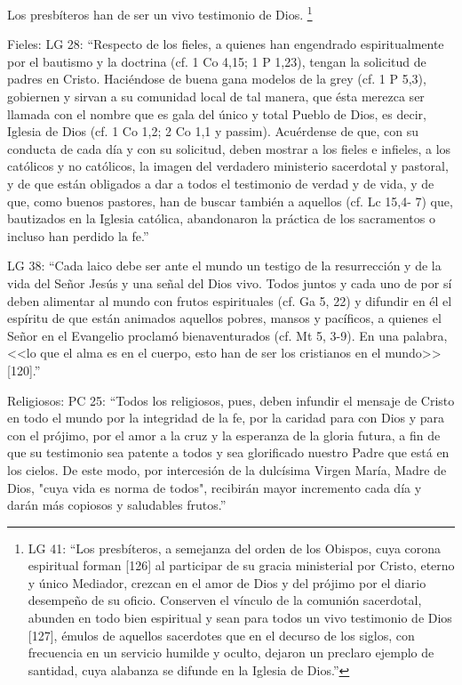 \documentclass[12pt]{article}
\begin{document}
Los presbíteros han de ser un vivo testimonio de Dios.
\footnote{
LG 41: 
``Los presbíteros, a semejanza del orden de los Obispos, cuya corona espiritual forman [126] al participar de su gracia ministerial por Cristo, eterno y único Mediador, crezcan en el amor de Dios y del prójimo por el diario desempeño de su oficio. Conserven el vínculo de la comunión sacerdotal, abunden en todo bien espiritual y sean para todos un vivo testimonio de Dios [127], émulos de aquellos sacerdotes que en el decurso de los siglos, con frecuencia en un servicio humilde y oculto, dejaron un preclaro ejemplo de santidad, cuya alabanza se difunde en la Iglesia de Dios.''
}

Fieles:
LG 28:  
``Respecto de los fieles, a quienes han engendrado espiritualmente por el bautismo y la doctrina (cf. 1 Co 4,15; 1 P 1,23), tengan la solicitud de padres en Cristo. Haciéndose de buena gana modelos de la grey (cf.  1 P 5,3), gobiernen y sirvan a su comunidad local de tal manera, que ésta merezca ser llamada con el nombre que es gala del único y total Pueblo de Dios, es decir, Iglesia de Dios (cf. 1 Co 1,2; 2 Co 1,1 y passim). Acuérdense de que, con su conducta de cada día y con su solicitud, deben mostrar a los fieles e infieles, a los católicos y no católicos, la imagen del verdadero ministerio sacerdotal y pastoral, y de que están obligados a dar a todos el testimonio de verdad y de vida, y de que, como buenos pastores, han de buscar también a aquellos (cf. Lc 15,4- 7) que, bautizados en la Iglesia católica, abandonaron la práctica de los sacramentos o incluso han perdido la fe.''

LG 38:
``Cada laico debe ser ante el mundo un testigo de la resurrección y de la vida del Señor Jesús y una señal del Dios vivo. Todos juntos y cada uno de por sí deben alimentar al mundo con frutos espirituales (cf. Ga 5, 22) y difundir en él el espíritu de que están animados aquellos pobres, mansos y pacíficos, a quienes el Señor en el Evangelio proclamó bienaventurados (cf. Mt 5, 3-9). En una palabra, <<lo que el alma es en el cuerpo, esto han de ser los cristianos en el mundo>> [120].''

Religiosos:
PC 25:
``Todos los religiosos, pues, deben infundir el mensaje de Cristo en todo el mundo por la integridad de la fe, por la caridad para con Dios y para con el prójimo, por el amor a la cruz y la esperanza de la gloria futura, a fin de que su testimonio sea patente a todos y sea glorificado nuestro Padre que está en los cielos. De este modo, por intercesión de la dulcísima Virgen María, Madre de Dios, "cuya vida es norma de todos", recibirán mayor incremento cada día y darán más copiosos y saludables frutos.''
\end{document}
